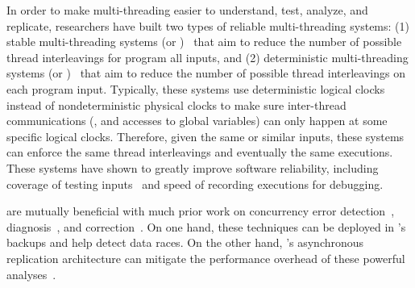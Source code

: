  In order to make multi-threading easier to 
understand, test, analyze, and replicate, researchers have built two types of 
reliable multi-threading systems: (1) stable multi-threading systems (or 
\smt)~\cite{grace:oopsla09, dthreads:sosp11, determinator:osdi10} that aim to 
reduce the number of possible thread interleavings for program all inputs, and 
(2) deterministic multi-threading systems (or \dmt)~\cite{dpj:oopsla09, 
dmp:asplos09,kendo:asplos09,coredet:asplos10,dos:osdi10,ddos:asplos13,
ics:oopsla13} that aim to reduce the number of possible thread interleavings on 
each program input. Typically, these systems use deterministic logical clocks 
instead of nondeterministic physical clocks to make sure inter-thread 
communications (\eg, \mutexlock and accesses to global variables) can only 
happen at some specific logical clocks. Therefore, given the same or similar 
inputs, these systems can enforce the same thread interleavings and eventually 
the same executions. These systems 
have shown to greatly improve software reliability, including coverage of 
testing inputs~\cite{ics:oopsla13} and speed of recording 
executions\cite{dos:osdi10} for debugging.

 \xxx are mutually beneficial with much prior work on 
concurrency error 
detection~\cite{yu:racetrack:sosp,savage:eraser,racerx:sosp03,lu:muvi:sosp,
avio:asplos06,conmem:asplos10},
diagnosis~\cite{racefuzzer:pldi08,ctrigger:asplos09,atomfuzzer:fse08}, and
correction~\cite{dimmunix:osdi08,gadara:osdi08,wu:loom:osdi10,cfix:osdi12}. 
On one hand, these techniques can be deployed in \xxx's backups and help 
\xxx detect data races. On the other hand, \xxx's asynchronous replication 
architecture can mitigate the performance overhead of these powerful 
analyses~\cite{repframe:apsys15}.


